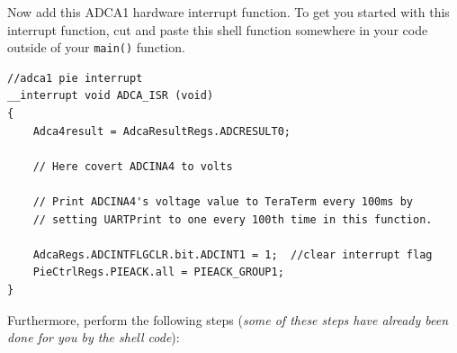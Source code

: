 \documentclass[11pt]{article}
\begin{document}
Now add this ADCA1 hardware interrupt function. To get you started with this interrupt function, cut and paste this shell function somewhere in your code outside of your \texttt{main()} function.
%
\begin{verbatim}
//adca1 pie interrupt
__interrupt void ADCA_ISR (void)
{
    Adca4result = AdcaResultRegs.ADCRESULT0;

    // Here covert ADCINA4 to volts

    // Print ADCINA4's voltage value to TeraTerm every 100ms by
    // setting UARTPrint to one every 100th time in this function.

    AdcaRegs.ADCINTFLGCLR.bit.ADCINT1 = 1;  //clear interrupt flag
    PieCtrlRegs.PIEACK.all = PIEACK_GROUP1;
}
\end{verbatim}
%
Furthermore, perform the following steps (\textit{some of these steps have already been done for you by the shell code}):
%
\end{document}
